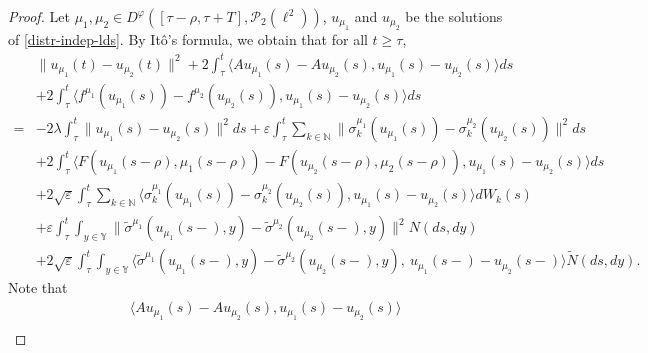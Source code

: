\documentclass[11pt]{article}
\numberwithin{equation}{section}
\theoremstyle{plain}
\begin{document}
\begin{proof}
 Let $ \mu_1, \mu_2 \in D^\varphi([\tau-\rho,\tau + T], \mathcal{P}_2(\ell^2) )$,
     $ u_{\mu_1} $ and $ u_{\mu_2} $ be the solutions of \eqref{distr-indep-lds}.
 By It\^{o}'s formula,
 we obtain that for all $t\ge \tau$,
 \begin{align}\label{wps-1}
    & \|u_{\mu_1}(t) - u_{\mu_2}(t) \|^2
       + 2 \int_{\tau}^{t}
       \langle  A u_{\mu_1}(s) - A u_{\mu_2}(s) ,
               u_{\mu_1}(s) - u_{\mu_2}(s)
       \rangle ds \nonumber \\
   & + 2 \int_{\tau}^{t}
       \langle f^{\mu_1}(u_{\mu_1}(s)) - f^{\mu_2}(u_{\mu_2}(s)),
               u_{\mu_1}(s) - u_{\mu_2}(s)
       \rangle ds \nonumber \\
  = & - 2 \lambda \int_{\tau}^{t}
        \|  u_{\mu_1}(s) - u_{\mu_2}(s) \|^2 ds
      + \varepsilon \int_{\tau}^{t}
              \sum_{k \in \mathbb{N}}
                                     \| \sigma^{\mu_1}_k(u_{\mu_1}(s)) - \sigma^{\mu_2}_k(u_{\mu_2}(s)) \|^2
           ds \nonumber\\
    & + 2 \int_{\tau}^{t}
             \langle F( u_{\mu_1}(s-\rho),  
             {\mu_1}(s-\rho) ) - F( u_{\mu_2}(s-\rho), 
             {\mu_2}(s-\rho) ),
                     u_{\mu_1}(s) - u_{\mu_2}(s)
             \rangle ds \nonumber\\
    & + 2\sqrt{\varepsilon} \int_{\tau}^{t}
             \sum_{k \in \mathbb{N}}
                 \langle \sigma^{\mu_1}_k(u_{\mu_1}(s)) - \sigma^{\mu_2}_k(u_{\mu_2}(s)),
                         u_{\mu_1}(s) - u_{\mu_2}(s)
                 \rangle
          dW_k(s)  \nonumber \\
    & + \varepsilon \int_{\tau}^{t} 
                 \int_{y\in \mathbb{Y}
                 }
                             \| \widetilde{\sigma}^{\mu_1}(u_{\mu_1}(s-),y)
                                - \widetilde{\sigma}^{\mu_2}(u_{\mu_2}(s-),y) \|^2
            {N}(ds, dy)  \nonumber \\
    & +2 \sqrt{\varepsilon} \int_{\tau}^{t} 
              \int_{y\in \mathbb{Y}
              }
                   \langle\widetilde{\sigma}^{\mu_1}(u_{\mu_1}(s-),y) 
                                         - \widetilde{\sigma}^{\mu_2}(u_{\mu_2}(s-),y) ,\     u_{\mu_1}(s-) - u_{\mu_2}(s-)    \rangle
           \widetilde{N}(ds, dy).
 \end{align}
  Note that
 \begin{align*}
       & \langle  A u_{\mu_1}(s) - A u_{\mu_2}(s) ,
               u_{\mu_1}(s) - u_{\mu_2}(s)
         \rangle  \nonumber \\

\end{align*}
\end{proof}
\end{document}
